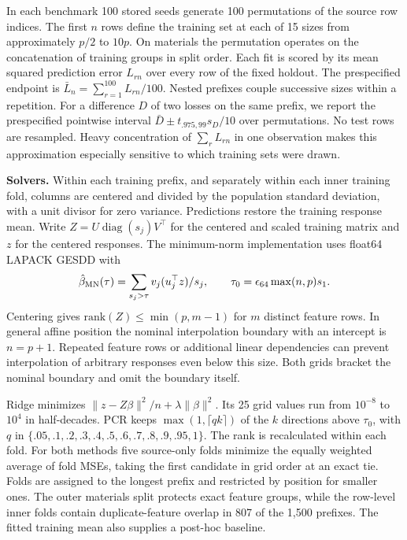 In each benchmark 100 stored seeds generate 100 permutations of the source row indices. The first $n$ rows define the training set at each of 15 sizes from approximately $p/2$ to $10p$. On materials the permutation operates on the concatenation of training groups in split order. Each fit is scored by its mean squared prediction error $L_{rn}$ over every row of the fixed holdout. The prespecified endpoint is $\bar L_n=\sum_{r=1}^{100} L_{rn}/100$. Nested prefixes couple successive sizes within a repetition. For a difference $D$ of two losses on the same prefix, we report the prespecified pointwise interval $\bar D\pm t_{.975,99}s_D/10$ over permutations. No test rows are resampled. Heavy concentration of $\sum_r L_{rn}$ in one observation makes this approximation especially sensitive to which training sets were drawn.

\textbf{Solvers.} Within each training prefix, and separately within each inner training fold, columns are centered and divided by the population standard deviation, with a unit divisor for zero variance. Predictions restore the training response mean. Write $Z=U\operatorname{diag}(s_j)V^\top$ for the centered and scaled training matrix and $z$ for the centered responses. The minimum-norm implementation uses float64 LAPACK GESDD with
\[
 \hat\beta_{\mathrm{MN}}(\tau)=\sum_{s_j>\tau} v_j (u_j^\top z)/s_j,\qquad
 \tau_0=\epsilon_{64}\max(n,p)s_1 .
\]
Centering gives $\mathrm{rank}(Z)\le\min(p,m-1)$ for $m$ distinct feature rows. In general affine position the nominal interpolation boundary with an intercept is $n=p+1$. Repeated feature rows or additional linear dependencies can prevent interpolation of arbitrary responses even below this size. Both grids bracket the nominal boundary and omit the boundary itself.

Ridge minimizes $\|z-Z\beta\|^2/n+\lambda\|\beta\|^2$. Its 25 grid values run from $10^{-8}$ to $10^4$ in half-decades. PCR keeps $\max(1,\lceil qk\rceil)$ of the $k$ directions above $\tau_0$, with $q$ in $\{.05,\allowbreak .1,\allowbreak .2,\allowbreak .3,\allowbreak .4,\allowbreak .5,\allowbreak .6,\allowbreak .7,\allowbreak .8,\allowbreak .9,\allowbreak .95,\allowbreak 1\}$. The rank is recalculated within each fold. For both methods five source-only folds minimize the equally weighted average of fold MSEs, taking the first candidate in grid order at an exact tie. Folds are assigned to the longest prefix and restricted by position for smaller ones. The outer materials split protects exact feature groups, while the row-level inner folds contain duplicate-feature overlap in 807 of the 1,500 prefixes. The fitted training mean also supplies a post-hoc baseline.

